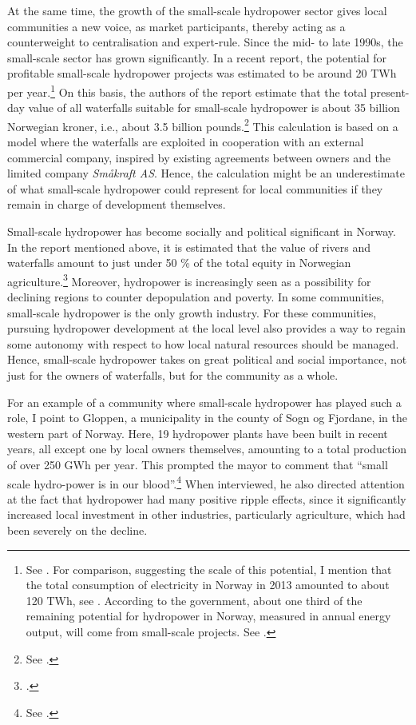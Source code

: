 At the same time, the growth of the small-scale hydropower sector gives local communities a new voice, as market participants, thereby acting as a counterweight to centralisation and expert-rule. Since the mid- to late 1990s, the small-scale sector has grown significantly. In a recent report, the potential for profitable small-scale hydropower projects was estimated to be around 20 TWh per year.\footnote{See \cite{aanesland09}. For comparison, suggesting the scale of this potential, I mention that the total consumption of electricity in Norway in 2013 amounted to about 120 TWh, see \cite{statistikk13}. According to the government, about one third of the remaining potential for hydropower in Norway, measured in annual energy output, will come from small-scale projects. See \cite[231]{nou129}.} On this basis, the authors of the report estimate that the total present-day value of all waterfalls suitable for small-scale hydropower is about 35 billion Norwegian kroner, i.e., about 3.5 billion pounds.\footnote{See \cite[1]{aanesland09}.} This calculation is based on a model where the waterfalls are exploited in cooperation with an external commercial company, inspired by existing agreements between owners and the limited company {\it Småkraft AS}. Hence, the calculation might be an underestimate of what small-scale hydropower could represent for local communities if they remain in charge of development themselves.

Small-scale hydropower has become socially and political significant in Norway. In the report mentioned above, it is estimated that the value of rivers and waterfalls amount to just under 50 \% of the total equity in Norwegian agriculture.\footcite[1]{aanesland09} Moreover, hydropower is increasingly seen as a possibility for declining regions to counter depopulation and poverty. In some communities, small-scale hydropower is the only growth industry. For these communities, pursuing hydropower development at the local level also provides a way to regain some autonomy with respect to how local natural resources should be managed. Hence, small-scale hydropower takes on great political and social importance, not just for the owners of waterfalls, but for the community as a whole.

For an example of a community where small-scale hydropower has played such a role, I point to Gloppen, a municipality in the county of Sogn og Fjordane, in the western part of Norway. Here, 19 hydropower plants have been built in recent years, all except one by local owners themselves, amounting to a total production of over 250 GWh per year. This prompted the mayor to comment that ``small scale hydro-power is in our blood''.\footnote{See \cite{starheim12}.} When interviewed, he also directed attention at the fact that hydropower had many positive ripple effects, since it significantly increased local investment in other industries, particularly agriculture, which had been severely on the decline.

